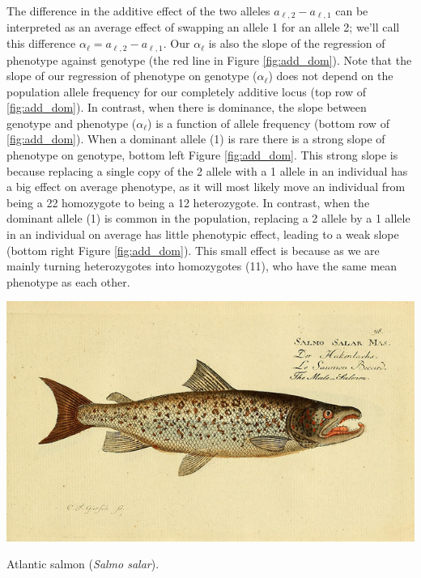 The difference in the additive effect of the two alleles $a_{\ell, 2}-a_{\ell,
1}$ can be interpreted as an average effect of swapping an allele 1 for an
allele 2; we'll call this difference $\alpha_{\ell}=a_{\ell, 2}-a_{\ell, 1}$.
Our $\alpha_{\ell}$ is also the slope of the regression of phenotype against
genotype (the red line in Figure \ref{fig:add_dom}). Note that the slope of
our regression of phenotype on genotype ($\alpha_{\ell}$)  does not depend on the population
allele frequency for our completely additive locus (top row of
\ref{fig:add_dom}). In contrast, when there is dominance, the slope between
genotype and phenotype ($\alpha_{\ell}$) is a function of allele frequency
(bottom row of \ref{fig:add_dom}). When a dominant allele (1) is rare there is
a strong slope of phenotype on genotype, bottom left Figure \ref{fig:add_dom}.
This strong slope is because replacing a single copy of the 2 allele with a 1
allele in an individual has a big effect on average phenotype, as it will most
likely move an individual from being a 22 homozygote to being a 12
heterozygote. In contrast, when the dominant allele (1) is common in the
population, replacing a 2 allele by a 1 allele in an individual on average has
little phenotypic effect, leading to a weak slope (bottom right Figure \ref{fig:add_dom}). This small effect is because as we are mainly turning
heterozygotes into homozygotes (11), who have the same mean phenotype as each other.  \\


\begin{marginfigure}
\begin{center}
\includegraphics[width=\textwidth]{illustration_images/Quant_gen/Salmon/6918368208_5353868a88_z.jpg}
\end{center}
\caption{Atlantic salmon ({\it Salmo salar}). } \label{fig:Salmon}
\end{marginfigure}


